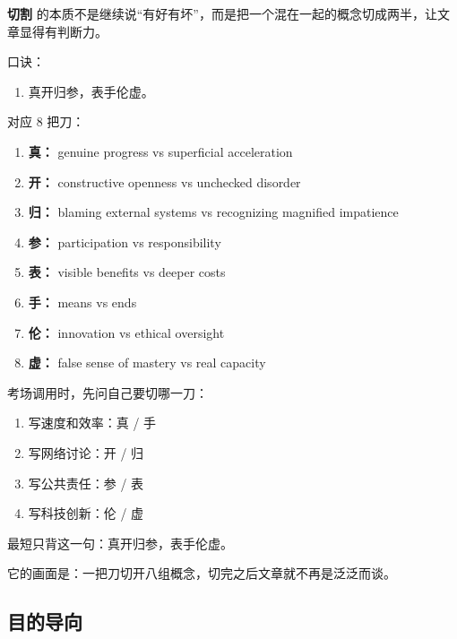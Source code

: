 ﻿\documentclass[lang=cn,11pt]{elegantbook}
\begin{document}
\begin{note}
\textbf{切割} 的本质不是继续说“有好有坏”，而是把一个混在一起的概念切成两半，让文章显得有判断力。

口诀：

\begin{enumerate}
  \item 真开归参，表手伦虚。
\end{enumerate}

对应 8 把刀：

\begin{enumerate}
  \item \textbf{真：} genuine progress vs superficial acceleration
  \item \textbf{开：} constructive openness vs unchecked disorder
  \item \textbf{归：} blaming external systems vs recognizing magnified impatience
  \item \textbf{参：} participation vs responsibility
  \item \textbf{表：} visible benefits vs deeper costs
  \item \textbf{手：} means vs ends
  \item \textbf{伦：} innovation vs ethical oversight
  \item \textbf{虚：} false sense of mastery vs real capacity
\end{enumerate}

考场调用时，先问自己要切哪一刀：

\begin{enumerate}
  \item 写速度和效率：真 / 手
  \item 写网络讨论：开 / 归
  \item 写公共责任：参 / 表
  \item 写科技创新：伦 / 虚
\end{enumerate}

最短只背这一句：真开归参，表手伦虚。

它的画面是：一把刀切开八组概念，切完之后文章就不再是泛泛而谈。
\end{note}

\subsection{目的导向}
\end{document}
